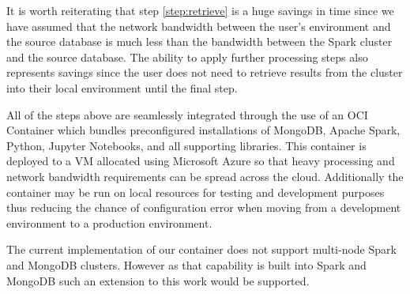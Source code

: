 \documentclass[conference,twoside]{IEEEtran}
\begin{document}
It is worth reiterating that step \ref{step:retrieve} is a huge savings in time since we have assumed that the network bandwidth between the user's environment and the source database is much less than the bandwidth between the Spark cluster and the source database. The ability to apply further processing steps also represents savings since the user does not need to retrieve results from the cluster into their local environment until the final step.

All of the steps above are seamlessly integrated through the use of an OCI Container which bundles preconfigured installations of MongoDB, Apache Spark, Python, Jupyter Notebooks, and all supporting libraries. This container is deployed to a VM allocated using Microsoft Azure so that heavy processing and network bandwidth requirements can be spread across the cloud. Additionally the container may be run on local resources for testing and development purposes thus reducing the chance of configuration error when moving from a development environment to a production environment.

The current implementation of our container does not support multi-node Spark and MongoDB clusters. However as that capability is built into Spark and MongoDB such an extension to this work would be supported.


\end{document}
